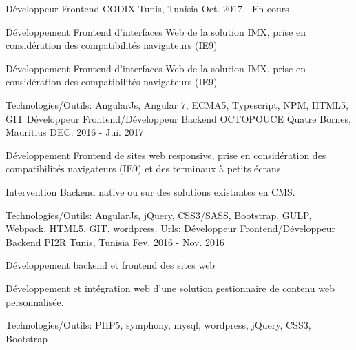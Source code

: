 \begin{cventries}
  \techentries
    {Développeur Frontend}
    {CODIX}
    {Tunis, Tunisia}
    {Oct. 2017 - En cours}
    {
      \begin{cvitems}
		\item {Développement Frontend d'interfaces Web de la solution IMX, prise en considération des compatibilités navigateurs (IE9)}		
		\item {Développement Frontend d'interfaces Web de la solution IMX, prise en considération des compatibilités navigateurs (IE9)}		
      \end{cvitems}
    }
    {\textcolor{awesome}{Technologies/Outils: } {\color{graytext}}  {AngularJs, Angular 7, ECMA5, Typescript, NPM, HTML5, GIT}}
	{} 
    { 
    }
  \techentries
    {Développeur Frontend/Développeur Backend}
    {OCTOPOUCE}
    {Quatre Bornes, Mauritius}
    {DEC. 2016 - Jui. 2017}
    {
      \begin{cvitems}
		\item {Développement Frontend de sites web responsive, prise en considération des compatibilités navigateurs (IE9) et des terminaux à petits écrans.}		
		\item {Intervention Backend native ou sur des solutions existantes en CMS.}
      \end{cvitems}
    }
    {\textcolor{awesome}{Technologies/Outils: } {\color{graytext}}  {AngularJs, jQuery, CSS3/SASS, Bootstrap, GULP, Webpack, HTML5, GIT, wordpress.}}
    {Urls:} 
    { \href{http://www.helloagency.com/}{} \break
     \href{http://anahita.mu/}{} \break
     \href{http://publicis-dashboard.octopouce.mu/en/}{}\break
    }
  \techentries
    {Développeur Frontend/Développeur Backend}
    {PI2R}
    {Tunis, Tunisia}
    {Fev. 2016 - Nov. 2016}
    {
      \begin{cvitems}
        \item {Développement backend et frontend des sites web }
        \item {Développement et intégration web d'une solution gestionnaire de contenu web personnalisée. }
      \end{cvitems}
    }
    {\textcolor{awesome}{Technologies/Outils: } {\color{graytext}}  {PHP5, symphony, mysql, wordpress, jQuery, CSS3, Bootstrap}}

\end{cventries}
